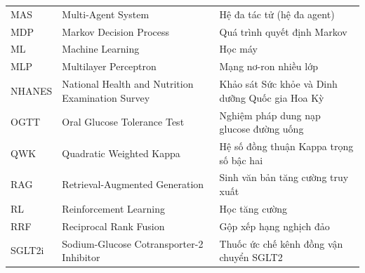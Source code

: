 \begin{spacing}{1.1}
\begin{longtable}{@{}L{2.3cm}L{6.3cm}L{6.0cm}@{}}
MAS & Multi-Agent System & Hệ đa tác tử (hệ đa agent) \\
MDP & Markov Decision Process & Quá trình quyết định Markov \\
ML & Machine Learning & Học máy \\
MLP & Multilayer Perceptron & Mạng nơ-ron nhiều lớp \\
NHANES & National Health and Nutrition Examination Survey & Khảo sát Sức khỏe và Dinh dưỡng Quốc gia Hoa Kỳ \\
OGTT & Oral Glucose Tolerance Test & Nghiệm pháp dung nạp glucose đường uống \\
QWK & Quadratic Weighted Kappa & Hệ số đồng thuận Kappa trọng số bậc hai \\
RAG & Retrieval-Augmented Generation & Sinh văn bản tăng cường truy xuất \\
RL & Reinforcement Learning & Học tăng cường \\
RRF & Reciprocal Rank Fusion & Gộp xếp hạng nghịch đảo \\
SGLT2i & Sodium-Glucose Cotransporter-2 Inhibitor & Thuốc ức chế kênh đồng vận chuyển SGLT2 \\
\bottomrule
\end{longtable}
\end{spacing}
